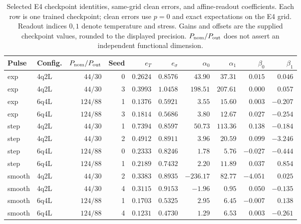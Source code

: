 \documentclass[11pt]{article}
\begin{document}
\begin{table}[htbp]
\centering
\caption{Selected E4 checkpoint identities, same-grid clean errors, and affine-readout coefficients. Each row is one trained checkpoint; clean errors use $p=0$ and exact expectations on the E4 grid. Readout indices $0,1$ denote temperature and stress. Gains and offsets are the supplied checkpoint values, rounded to the displayed precision. $P_{\rm nom}/P_{\rm out}$ does not assert an independent functional dimension.}
\label{tab:e4gainsclean}
\scriptsize
\setlength{\tabcolsep}{3pt}
\begin{tabular}{llrrrrrrrr}
\toprule
Pulse & Config. & $P_{\rm nom}/P_{\rm out}$ & Seed & $e_T$ & $e_\sigma$ & $\alpha_0$ & $\alpha_1$ & $\beta_0$ & $\beta_1$ \\
\midrule
exp & 4q2L & $44/30$ & 0 & $0.2624$ & $0.8576$ & $43.90$ & $37.31$ & $0.015$ & $0.046$ \\
exp & 4q2L & $44/30$ & 3 & $0.3993$ & $1.0458$ & $198.51$ & $207.61$ & $0.000$ & $0.057$ \\
exp & 6q4L & $124/88$ & 1 & $0.1376$ & $0.5921$ & $3.55$ & $15.60$ & $0.003$ & $-0.207$ \\
exp & 6q4L & $124/88$ & 3 & $0.1814$ & $0.5686$ & $3.80$ & $12.67$ & $0.027$ & $-0.254$ \\
\midrule
step & 4q2L & $44/30$ & 1 & $0.7394$ & $0.8597$ & $50.73$ & $113.36$ & $0.138$ & $-0.184$ \\
step & 4q2L & $44/30$ & 2 & $0.4912$ & $0.8911$ & $3.96$ & $20.59$ & $0.099$ & $-3.246$ \\
step & 6q4L & $124/88$ & 0 & $0.2333$ & $0.8246$ & $1.78$ & $5.76$ & $-0.027$ & $-0.444$ \\
step & 6q4L & $124/88$ & 1 & $0.2189$ & $0.7432$ & $2.20$ & $11.89$ & $0.037$ & $0.854$ \\
\midrule
smooth & 4q2L & $44/30$ & 2 & $0.3383$ & $0.8935$ & $-236.17$ & $82.77$ & $-4.051$ & $0.025$ \\
smooth & 4q2L & $44/30$ & 4 & $0.3115$ & $0.9153$ & $-1.96$ & $0.95$ & $0.050$ & $-0.135$ \\
smooth & 6q4L & $124/88$ & 1 & $0.1703$ & $0.5325$ & $2.95$ & $6.45$ & $-0.007$ & $0.138$ \\
smooth & 6q4L & $124/88$ & 4 & $0.1231$ & $0.4730$ & $1.29$ & $6.53$ & $0.003$ & $-0.261$ \\
\bottomrule
\end{tabular}
\end{table}
\end{document}
